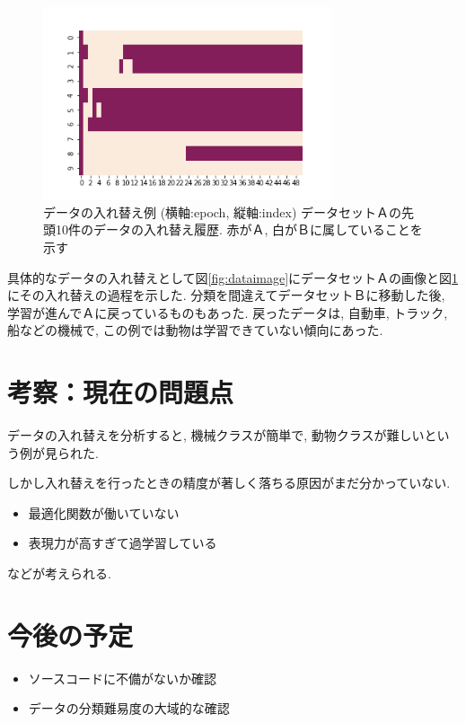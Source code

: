 \documentclass[twocolumn]{jarticle}     %
\begin{document}
\begin{figure}[tb]
	\begin{center}
		\includegraphics[clip,width=8.5cm]{swap_map.png}
		\caption{データの入れ替え例 (横軸:epoch, 縦軸:index) データセットＡの先頭10件のデータの入れ替え履歴. 赤がＡ, 白がＢに属していることを示す}
		\label{fig:swapmap}
	\end{center}
\end{figure}

具体的なデータの入れ替えとして図\ref{fig:dataimage}にデータセットＡの画像と図\ref{fig:swapmap}にその入れ替えの過程を示した. 分類を間違えてデータセットＢに移動した後, 学習が進んでＡに戻っているものもあった. 戻ったデータは, 自動車, トラック, 船などの機械で, この例では動物は学習できていない傾向にあった.



\section{考察：現在の問題点}
データの入れ替えを分析すると, 機械クラスが簡単で, 動物クラスが難しいという例が見られた.

しかし入れ替えを行ったときの精度が著しく落ちる原因がまだ分かっていない.
\begin{itemize}
	\item {最適化関数が働いていない}
	\item {表現力が高すぎて過学習している}
\end{itemize}
などが考えられる.

\section{今後の予定}
\begin{itemize}
	\item {ソースコードに不備がないか確認}
	\item {データの分類難易度の大域的な確認}
\end{itemize}
\end{document}
